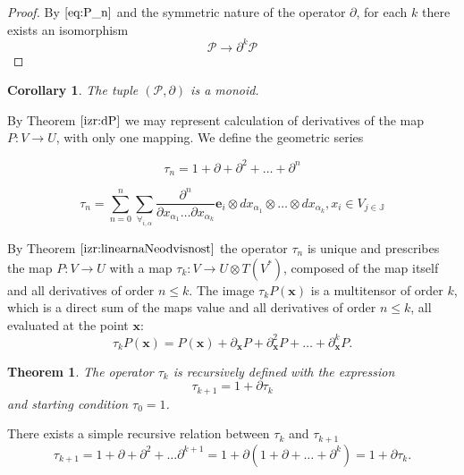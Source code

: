 \documentclass{article}
\newcommand{\JJ}{\mathbb{J}}
\newcommand{\e}{\mathbf{e}}
\newcommand{\x}{\mathbf{x}}
\newcommand{\dP}{\mathcal{P}}
\newcommand{\D}{\partial}
\newcommand{\sumd}{\tau}
\newtheorem{izrek}{Theorem}[section]
\newtheorem{corollary}{Corollary}[section]
\begin{document}
 \begin{proof}
 	 By $\eqref{eq:P_n}$ and the symmetric nature of the operator $\D$, for each $k$ there exists an isomorphism
 	 	\begin{equation}
 	 		\dP\to\D^k\dP
 	 	\end{equation}
 \end{proof}

\begin{corollary}\label{cor:dpMonoid}
The tuple $(\dP,\D)$ is a monoid.
\end{corollary}

By Theorem $\ref{izr:dP}$ we may represent calculation of derivatives of the map $P:V\to U$, with only one mapping. We define the geometric series
 
 \begin{equation}\label{eq:DD}
  	\sumd_n = 1+\D +\D^2 +\ldots + \D^n 
  \end{equation}
  
  
  \begin{equation}
  	\sumd_n=\sum\limits_{n=0}^{n}\sum_{\forall_{i,\alpha}}\frac{\partial^n}{\partial
  		    x_{\alpha_1}\ldots \partial x_{\alpha_k}}\e_i\otimes
  		  dx_{\alpha_1}\otimes\ldots \otimes dx_{\alpha_k} , x_i\in V_{j\in\JJ}
  \end{equation}
  
  By Theorem $\ref{izr:linearnaNeodvisnost}$ the operator $\sumd_n$ is unique and prescribes the map $P: V\to U$ with a map $\sumd_k:V\to
U\otimes T(V^*)$, composed of the map itself and all derivatives of order $n\le k$. The image $\sumd_kP(\x)$ is a multitensor of order $k$, which is a direct sum of the maps value and all derivatives of order $n\le k$, all evaluated at the point $\x$:
\begin{equation}
  \label{eq:multi_odvod}
  \sumd_kP(\x) = P(\x)+\D_\x P + \D^2_\x P + \ldots + \D^k_\x P.
\end{equation}
\begin{izrek}\label{izr:tauRek}
  The operator $\sumd_k$ is recursively defined with the expression
  \begin{equation}
    \label{eq:potenca(1+d)}
    \sumd_{k+1}=1+\D\sumd_{k}
  \end{equation}
and starting condition $\tau_0=1$.
\end{izrek}
There exists a simple recursive relation between $\sumd_k$ and $\sumd_{k+1}$
\begin{equation}
   \label{eq:rekurzija}
   \sumd_{k+1} = 1 + \D +\D^2+\ldots \D^{k+1} = 1+\D(1+\D+\ldots +\D^{k}) = 1+\D\sumd_k.
\end{equation} 
\end{document}
